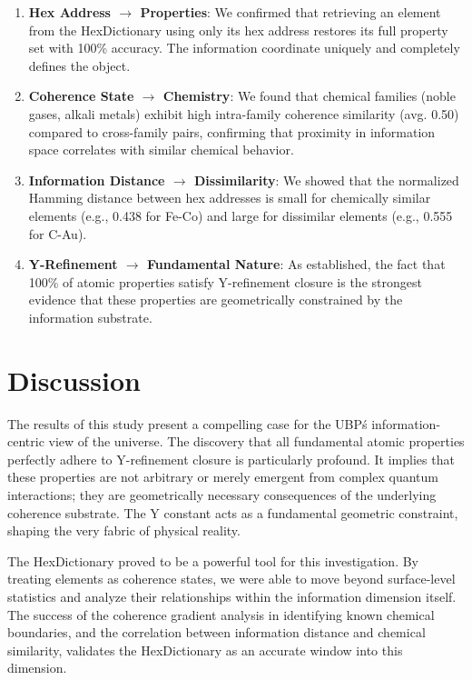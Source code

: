 \documentclass[12pt, a4paper]{article}
\begin{document}
\begin{enumerate}
    \item \textbf{Hex Address $\rightarrow$ Properties}: We confirmed that retrieving an element from the HexDictionary using only its hex address restores its full property set with 100\% accuracy. The information coordinate uniquely and completely defines the object.
    \item \textbf{Coherence State $\rightarrow$ Chemistry}: We found that chemical families (noble gases, alkali metals) exhibit high intra-family coherence similarity (avg. 0.50) compared to cross-family pairs, confirming that proximity in information space correlates with similar chemical behavior.
    \item \textbf{Information Distance $\rightarrow$ Dissimilarity}: We showed that the normalized Hamming distance between hex addresses is small for chemically similar elements (e.g., 0.438 for Fe-Co) and large for dissimilar elements (e.g., 0.555 for C-Au).
    \item \textbf{Y-Refinement $\rightarrow$ Fundamental Nature}: As established, the fact that 100\% of atomic properties satisfy Y-refinement closure is the strongest evidence that these properties are geometrically constrained by the information substrate.
\end{enumerate}


\section{Discussion}

The results of this study present a compelling case for the UBP\'s information-centric view of the universe. The discovery that all fundamental atomic properties perfectly adhere to Y-refinement closure is particularly profound. It implies that these properties are not arbitrary or merely emergent from complex quantum interactions; they are geometrically necessary consequences of the underlying coherence substrate. The Y constant acts as a fundamental geometric constraint, shaping the very fabric of physical reality.

The HexDictionary proved to be a powerful tool for this investigation. By treating elements as coherence states, we were able to move beyond surface-level statistics and analyze their relationships within the information dimension itself. The success of the coherence gradient analysis in identifying known chemical boundaries, and the correlation between information distance and chemical similarity, validates the HexDictionary as an accurate window into this dimension.
\end{document}
